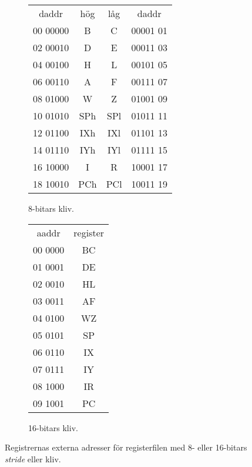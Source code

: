 \documentclass[main.tex]{subfiles}
\begin{document}
\begin{figure}[b!]
    \centering
    \begin{subfigure}{0.5\textwidth}
        \center
        \ttfamily
        \begin{tabular}{r|c|c|l}
            \multicolumn{1}{c}{daddr} &
            \multicolumn{1}{c}{\normalfont hög} &
            \multicolumn{1}{c}{\normalfont låg} &
            \multicolumn{1}{c}{daddr} \\ \cline{2-3}
            00 00000 & B   & C   & 00001 01 \\ \cline{2-3}
            02 00010 & D   & E   & 00011 03 \\ \cline{2-3}
            04 00100 & H   & L   & 00101 05 \\ \cline{2-3}
            06 00110 & A   & F   & 00111 07 \\ \cline{2-3}
            08 01000 & W   & Z   & 01001 09 \\ \cline{2-3}
            10 01010 & SPh & SPl & 01011 11 \\ \cline{2-3}
            12 01100 & IXh & IXl & 01101 13 \\ \cline{2-3}
            14 01110 & IYh & IYl & 01111 15 \\ \cline{2-3}
            16 10000 & I   & R   & 10001 17 \\ \cline{2-3}
            18 10010 & PCh & PCl & 10011 19 \\ \cline{2-3}
        \end{tabular}
        \caption{8-bitars kliv.}
        \label{fig:rfext8}
    \end{subfigure}%
    \begin{subfigure}{0.5\textwidth}
        \center
        \ttfamily
        \begin{tabular}{r|c|}
            \multicolumn{1}{c}{aaddr} &
            \multicolumn{1}{c}{\normalfont register} \\ \cline{2-2}
            00 0000 & BC \\ \cline{2-2}
            01 0001 & DE \\ \cline{2-2}
            02 0010 & HL \\ \cline{2-2}
            03 0011 & AF \\ \cline{2-2}
            04 0100 & WZ \\ \cline{2-2}
            05 0101 & SP \\ \cline{2-2}
            06 0110 & IX \\ \cline{2-2}
            07 0111 & IY \\ \cline{2-2}
            08 1000 & IR \\ \cline{2-2}
            09 1001 & PC \\ \cline{2-2}
        \end{tabular}
        \caption{16-bitars kliv.}
    \end{subfigure}
    \caption{Registrernas externa adresser för registerfilen med 8- eller
    16-bitars {\it stride} eller kliv.}
    \label{fig:rfext}
\end{figure}
\end{document}
